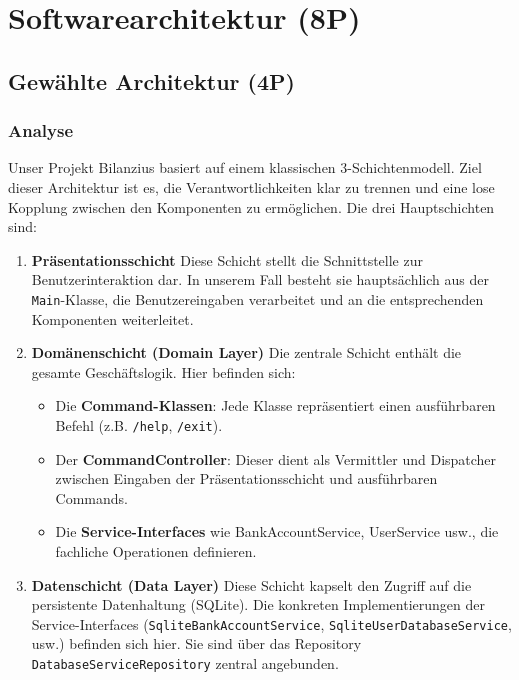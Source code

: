 \section{Softwarearchitektur (8P)}

\subsection{Gewählte Architektur (4P)}

\subsubsection*{Analyse}
Unser Projekt Bilanzius basiert auf einem klassischen 3-Schichtenmodell. Ziel dieser Architektur ist es, die Verantwortlichkeiten klar zu trennen und eine lose Kopplung zwischen den Komponenten zu ermöglichen. Die drei Hauptschichten sind:
\begin{enumerate}
    \item \textbf{Präsentationsschicht} \newline 
    Diese Schicht stellt die Schnittstelle zur Benutzerinteraktion dar. In unserem Fall besteht sie hauptsächlich aus der \texttt{Main}-Klasse, die Benutzereingaben verarbeitet und an die entsprechenden Komponenten weiterleitet.
    \item \textbf{Domänenschicht (Domain Layer)} \newline
    Die zentrale Schicht enthält die gesamte Geschäftslogik. Hier befinden sich:
    \begin{itemize}
        \item 
        Die \textbf{Command-Klassen}: Jede Klasse repräsentiert einen ausführbaren Befehl (z.B. \texttt{/help}, \texttt{/exit}).
        \item 
        Der \textbf{CommandController}: Dieser dient als Vermittler und Dispatcher zwischen Eingaben der Präsentationsschicht und ausführbaren Commands.
        \item 
        Die \textbf{Service-Interfaces} wie BankAccountService, UserService usw., die fachliche Operationen definieren.
    \end{itemize}
    \item \textbf{Datenschicht (Data Layer)} \newline
    Diese Schicht kapselt den Zugriff auf die persistente Datenhaltung (SQLite). Die konkreten Implementierungen der Service-Interfaces (\texttt{SqliteBankAccountService}, \texttt{SqliteUserDatabaseService}, usw.) befinden sich hier. Sie sind über das Repository \texttt{DatabaseServiceRepository} zentral angebunden.
\end{enumerate}

